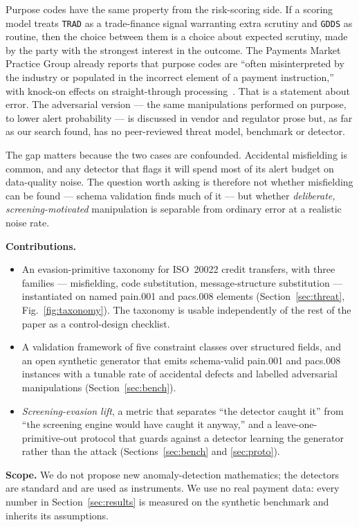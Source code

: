 \documentclass[conference]{IEEEtran}
\begin{document}
Purpose codes have the same property from the risk-scoring side. If a scoring
model treats \texttt{TRAD} as a trade-finance signal warranting extra
scrutiny and \texttt{GDDS} as routine, then the choice between them is a
choice about expected scrutiny, made by the party with the strongest interest
in the outcome. The Payments Market Practice Group already reports that
purpose codes are ``often misinterpreted by the industry or populated in the
incorrect element of a payment instruction,'' with knock-on effects on
straight-through processing~\cite{pmpg2024}. That is a statement about error.
The adversarial version --- the same manipulations performed on purpose, to
lower alert probability --- is discussed in vendor and regulator prose but,
as far as our search found, has no peer-reviewed threat model, benchmark or
detector.

The gap matters because the two cases are confounded. Accidental misfielding
is common, and any detector that flags it will spend most of its alert
budget on data-quality noise. The question worth asking is therefore not
whether misfielding can be found --- schema validation finds much of it ---
but whether \emph{deliberate, screening-motivated} manipulation is separable
from ordinary error at a realistic noise rate.

\textbf{Contributions.}
\begin{itemize}
\item An evasion-primitive taxonomy for ISO~20022 credit transfers, with
three families --- misfielding, code substitution, message-structure
substitution --- instantiated on named pain.001 and pacs.008 elements
(Section~\ref{sec:threat}, Fig.~\ref{fig:taxonomy}). The taxonomy is usable
independently of the rest of the paper as a control-design checklist.
\item A validation framework of five constraint classes over structured
fields, and an open synthetic generator that emits schema-valid pain.001 and
pacs.008 instances with a tunable rate of accidental defects and labelled
adversarial manipulations (Section~\ref{sec:bench}).
\item \emph{Screening-evasion lift}, a metric that separates ``the detector
caught it'' from ``the screening engine would have caught it anyway,'' and a
leave-one-primitive-out protocol that guards against a detector learning the
generator rather than the attack (Sections~\ref{sec:bench} and
\ref{sec:proto}).
\end{itemize}

\textbf{Scope.} We do not propose new anomaly-detection mathematics; the
detectors are standard and are used as instruments. We use no real payment
data: every number in Section~\ref{sec:results} is measured on the synthetic
benchmark and inherits its assumptions.
\end{document}
